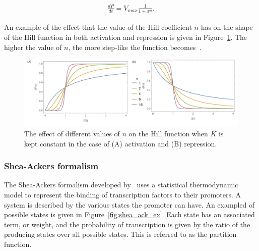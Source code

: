 \begin{align*}
	\frac{dP}{dt} = V_{max}\frac{1}{1 + x^n}.
\end{align*}



\noindent An example of the effect that the value of the Hill coefficient $n$ has on the shape of the Hill function in both activation and repression is given in Figure~\ref{fig:hill_ex}. The higher the value of $n$, the more step-like the function becomes~\autocite{Alon:2007}. 
\newpage

\begin{figure}[htb]
\centerfloat
    \includegraphics[scale=0.6]{../../chapters/chapterBackgr/images/hill_both-01.png}
    \caption[Hill formalism example]{The effect of different values of $n$ on the Hill function when $K$ is kept constant in the case of (A) activation and (B) repression.}
    \label{fig:hill_ex}
\end{figure}



\subsubsection{Shea-Ackers formalism}
\label{sec:shea-ackers}
The Shea-Ackers formalism developed by~\textcite{Ackers:1982tq} uses a statistical thermodynamic model to represent the binding of transcription factors to their promoters. A system is described by the various states the promoter can have. An exampled of possible states is given in Figure~\ref{fig:shea_ack_ex}. Each state has an associated term, or weight, and the probability of transcription is given by the ratio of the producing states over all possible states. This is referred to as the partition function. 

